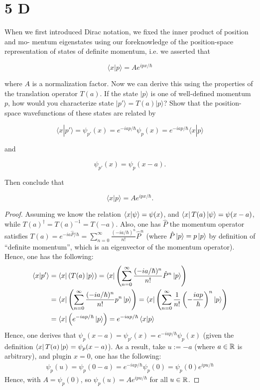 \documentclass{article}
\begin{document}
\newpage

\section*{5 D}

\begin{ques}
When we first introduced Dirac notation, we fixed the inner product of position and mo-
mentum eigenstates using our foreknowledge of the position-space representation of states
of definite momentum, i.e. we asserted that

\[
\langle x|p\rangle = A e^{ipx/\hbar}
\]

where $A$ is a normalization factor. Now we can derive this using the properties of the
translation operator $T(a)$. If the state $|p\rangle$ is one of well-defined momentum $p$, how would
you characterize state $|p'\rangle = T(a)|p\rangle$? Show that the position-space wavefunctions of these
states are related by

\[
\langle x|p'\rangle = \psi_{p'}(x) = e^{-iap/\hbar}\psi_p(x) = e^{-iap/\hbar} \langle x|p\rangle
\]

and

\[
\psi_{p'}(x) = \psi_p(x-a).
\]

Then conclude that

\[
\langle x|p\rangle = A e^{ipx/\hbar}.
\]
\end{ques}

\begin{proof}
    Assuming we know the relation $\braket{x}{\psi}=\psi(x)$, and $\bra{x}T(a)\ket{\psi} = \psi(x-a)$, while $T(a)^\dagger = T(a)^{-1}=T(-a)$. Also, one has $\hat{P}$ the momentum operator satisfies $T(a)=e^{-ia\hat{P}/\hbar} = \sum_{n=0}^{\infty}\frac{(-ia/\hbar)^n}{n!}\hat{P}^n$ (where $\hat{P}\ket{p} = p\ket{p}$ by definition of ``definite momentum'', which is an eigenvector of the momentum operator). Hence, one has the following:  
    \begin{align}
        \braket{x}{p'} &= \bra{x}(T(a)\ket{p}) = \bra{x}\left(\sum_{n=0}^{\infty}\frac{(-ia/\hbar)^n}{n!}\hat{P}^n\ket{p}\right)\\
        &= \bra{x}\left(\sum_{n=0}^{\infty}\frac{(-ia/\hbar)^n}{n!}p^n\ket{p}\right) = \bra{x}\left(\sum_{n=0}^{\infty}\frac{1}{n!}\left(-\frac{iap}{\hbar}\right)^n\ket{p}\right)\\
        &= \bra{x}\left(e^{-iap/\hbar}\ket{p}\right) = e^{-iap/\hbar}\braket{x}{p}
    \end{align}
    Hence, one derives that $\psi_p(x-a)=\psi_{p'}(x) = e^{-iap/\hbar}\psi_p(x)$ (given the definition $\bra{x}T(a)\ket{p} = \psi_p(x-a)$). As a result, take $u := -a$ (where $a\in\mathbb{R}$ is arbitrary), and plugin $x=0$, one has the following:
    \begin{align}
        \psi_p(u) = \psi_p(0-a) = e^{-iap/\hbar}\psi_p(0) = \psi_p(0)e^{ipu/\hbar}
    \end{align} 
    Hence, with $A = \psi_p(0)$, so $\psi_p(u)=Ae^{ipu/\hbar}$ for all $u\in\mathbb{R}$.
\end{proof}
\end{document}
